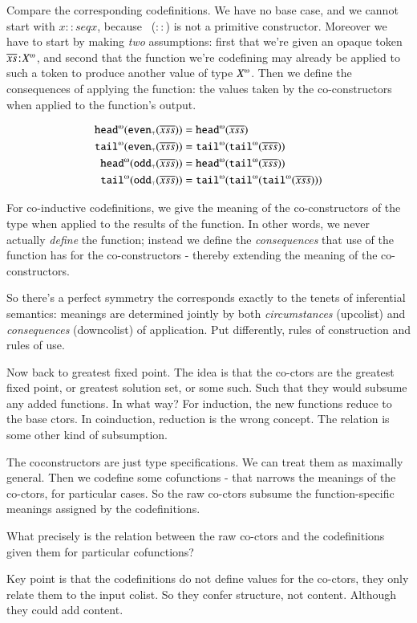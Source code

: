 Compare the corresponding codefinitions. We have no base case, and we
cannot start with \(x::seq{x}\), because \cons\ (\(::\)) is not a
primitive constructor. Moreover we have to start by making
\textit{two} assumptions: first that we're given an opaque token
\(\tj{\coseq{x}}{\colist{X}}\), and second that the function we're
codefining may already be applied to such a token to produce another
value of type \(\colist{X}\). Then we define the consequences of
applying the function: the values taken by the co-constructors when
applied to the function's output.

\begin{align}
  \cohead(\codefn{even}(\coseq{xs})) & = \cohead(\coseq{xs}) \\
  \cotail(\codefn{even}(\coseq{xs})) & = \cotail(\cotail(\coseq{xs})) \\
  \cohead(\codefn{odd}(\coseq{xs})) & = \cohead(\cotail(\coseq{xs})) \\
  \cotail(\codefn{odd}(\coseq{xs})) & = \cotail(\cotail(\cotail(\coseq{xs})))
\end{align}

For co-inductive codefinitions, we give the meaning of the
co-constructors of the type when applied to the results of the
function. In other words, we never actually \textit{define} the
function; instead we define the \textit{consequences} that use of the
function has for the co-constructors - thereby extending the meaning
of the co-constructors.

So there's a perfect symmetry the corresponds exactly to the tenets of
inferential semantics: meanings are determined jointly by both
\textit{circumstances} (upcolist) and \textit{consequences}
(downcolist) of application. Put differently, rules of construction
and rules of use.

Now back to greatest fixed point. The idea is that the co-ctors are
the greatest fixed point, or greatest solution set, or some such. Such
that they would subsume any added functions. In what way? For
induction, the new functions reduce to the base ctors. In coinduction,
reduction is the wrong concept. The relation is some other kind of
subsumption.

The coconstructors are just type specifications. We can treat them as
maximally general. Then we codefine some cofunctions - that narrows
the meanings of the co-ctors, for particular cases. So the raw
co-ctors subsume the function-specific meanings assigned by the
codefinitions.

What precisely is the relation between the raw co-ctors and the
codefinitions given them for particular cofunctions?

Key point is that the codefinitions do not define values for the
co-ctors, they only relate them to the input colist. So they confer
structure, not content.  Although they could add content.
